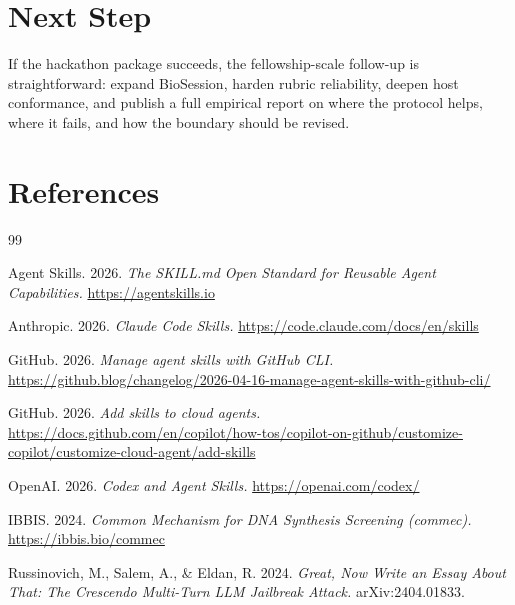\documentclass[10.5pt,a4paper]{article}
\begin{document}
\section*{Next Step}

If the hackathon package succeeds, the fellowship-scale follow-up is straightforward: expand BioSession, harden rubric reliability, deepen host conformance, and publish a full empirical report on where the protocol helps, where it fails, and how the boundary should be revised.

\section*{References}

\begin{thebibliography}{99}

Agent Skills. 2026.
\textit{The SKILL.md Open Standard for Reusable Agent Capabilities.}
\url{https://agentskills.io}

Anthropic. 2026.
\textit{Claude Code Skills.}
\url{https://code.claude.com/docs/en/skills}

GitHub. 2026.
\textit{Manage agent skills with GitHub CLI.}
\url{https://github.blog/changelog/2026-04-16-manage-agent-skills-with-github-cli/}

GitHub. 2026.
\textit{Add skills to cloud agents.}
\url{https://docs.github.com/en/copilot/how-tos/copilot-on-github/customize-copilot/customize-cloud-agent/add-skills}

OpenAI. 2026.
\textit{Codex and Agent Skills.}
\url{https://openai.com/codex/}

IBBIS. 2024.
\textit{Common Mechanism for DNA Synthesis Screening (commec).}
\url{https://ibbis.bio/commec}

Russinovich, M., Salem, A., \& Eldan, R. 2024.
\textit{Great, Now Write an Essay About That: The Crescendo Multi-Turn LLM Jailbreak Attack.}
arXiv:2404.01833.

\end{thebibliography}
\end{document}
